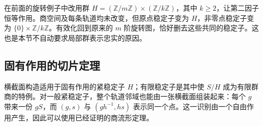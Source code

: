\begin{example}\label{g1:exm:ineffective-local-quotient}
	在前面的旋转例子中改用群 \(H=(\mathbb Z/m\mathbb Z)\times(\mathbb Z/k\mathbb Z)\)，其中 \(k\geq2\)，让第二因子恒等作用。商空间及每条轨道均未改变，但原点稳定子变为 \(H\)，非零点稳定子变为 \(\{0\}\times\mathbb Z/k\mathbb Z\)。有效化回到原来的 \(m\) 阶旋转图，恰好删去这些共同的稳定子。这也是本节不自动要求局部群表示忠实的原因。
\end{example}

\subsection{固有作用的切片定理}
\label{g1:subsec:1704:04}

横截面构造适用于固有作用的紧稳定子 \(H\)；有限稳定子是其中使 \(S/H\) 成为有限群商的特例。对一般紧稳定子，整个轨道邻域也能由一张横截面组装起来：每个 \(g\) 带来一份 \(gS\)，而 \((g,s)\) 与 \((gh^{-1},hs)\) 表示同一个点。这一识别由一个自由作用产生，因此可以使用已经证明的商流形定理。

